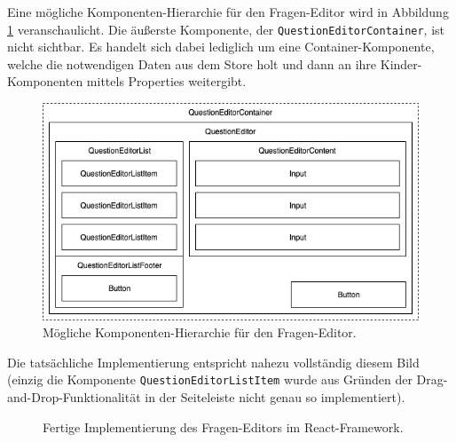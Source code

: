 Eine mögliche Komponenten-Hierarchie für den Fragen-Editor wird in Abbildung \ref{abb:komponenten_hierarchie} veranschaulicht. Die äußerste Komponente, der \texttt{QuestionEditorContainer}, ist nicht sichtbar. Es handelt sich dabei lediglich um eine Container-Komponente, welche die notwendigen Daten aus dem Store holt und dann an ihre Kinder-Komponenten mittels Properties weitergibt.

\begin{figure}[H]
    \includegraphics[width=\textwidth]{chapter/entwurf/bilder/Component_Hierarchy.png}
    \centering
    \caption{Mögliche Komponenten-Hierarchie für den Fragen-Editor.}
    \label{abb:komponenten_hierarchie}
\end{figure}

Die tatsächliche Implementierung entspricht nahezu vollständig diesem Bild (einzig die Komponente \texttt{QuestionEditorListItem} wurde aus Gründen der Drag-and-Drop-Funktionalität in der Seiteleiste nicht genau so implementiert).


\begin{figure}[H]
    \centering
    \setlength{\fboxsep}{0pt}
    \setlength{\fboxrule}{0.5pt}
    \caption{Fertige Implementierung des Fragen-Editors im React-Framework.}
    \label{abb:weclare_editor}
\end{figure}

